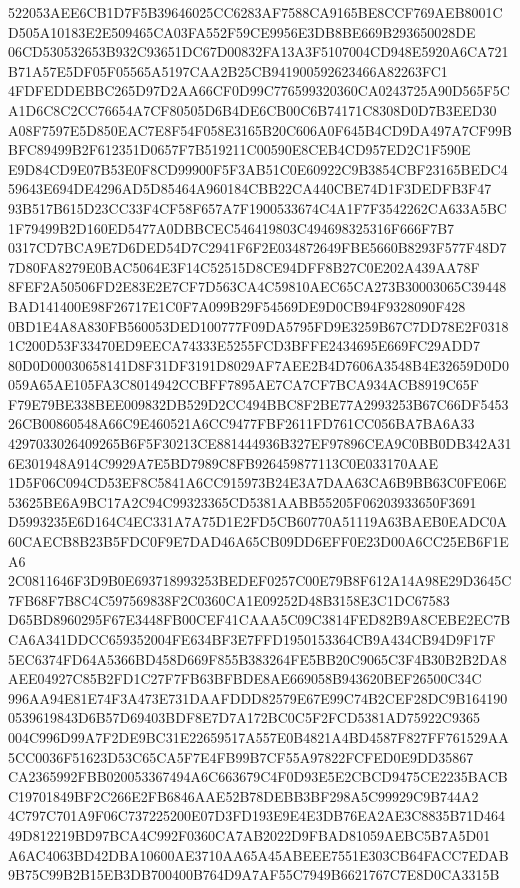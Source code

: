 \documentclass[UTF8,fontset=fandol,zihao=-4,a4paper]{ctexart}
\begin{document}
{{522053AEE6CB1D7F5B39646025CC6283AF7588CA9165BE8CCF769AEB8001CD505A10183E2E509465CA03FA552F59CE9956E3DB8BE669B293650028DE
06CD530532653B932C93651DC67D00832FA13A3F5107004CD948E5920A6CA721B71A57E5DF05F05565A5197CAA2B25CB941900592623466A82263FC1
4FDFEDDEBBC265D97D2AA66CF0D99C776599320360CA0243725A90D565F5CA1D6C8C2CC76654A7CF80505D6B4DE6CB00C6B74171C8308D0D7B3EED30
A08F7597E5D850EAC7E8F54F058E3165B20C606A0F645B4CD9DA497A7CF99BBFC89499B2F612351D0657F7B519211C00590E8CEB4CD957ED2C1F590E
E9D84CD9E07B53E0F8CD99900F5F3AB51C0E60922C9B3854CBF23165BEDC459643E694DE4296AD5D85464A960184CBB22CA440CBE74D1F3DEDFB3F47
93B517B615D23CC33F4CF58F657A7F1900533674C4A1F7F3542262CA633A5BC1F79499B2D160ED5477A0DBBCEC546419803C494698325316F666F7B7
0317CD7BCA9E7D6DED54D7C2941F6F2E034872649FBE5660B8293F577F48D77D80FA8279E0BAC5064E3F14C52515D8CE94DFF8B27C0E202A439AA78F
8FEF2A50506FD2E83E2E7CF7D563CA4C59810AEC65CA273B30003065C39448BAD141400E98F26717E1C0F7A099B29F54569DE9D0CB94F9328090F428
0BD1E4A8A830FB560053DED100777F09DA5795FD9E3259B67C7DD78E2F03181C200D53F33470ED9EECA74333E5255FCD3BFFE2434695E669FC29ADD7
80D0D00030658141D8F31DF3191D8029AF7AEE2B4D7606A3548B4E32659D0D0059A65AE105FA3C8014942CCBFF7895AE7CA7CF7BCA934ACB8919C65F
F79E79BE338BEE009832DB529D2CC494BBC8F2BE77A2993253B67C66DF545326CB00860548A66C9E460521A6CC9477FBF2611FD761CC056BA7BA6A33
4297033026409265B6F5F30213CE881444936B327EF97896CEA9C0BB0DB342A316E301948A914C9929A7E5BD7989C8FB926459877113C0E033170AAE
1D5F06C094CD53EF8C5841A6CC915973B24E3A7DAA63CA6B9BB63C0FE06E53625BE6A9BC17A2C94C99323365CD5381AABB55205F06203933650F3691
D5993235E6D164C4EC331A7A75D1E2FD5CB60770A51119A63BAEB0EADC0A60CAECB8B23B5FDC0F9E7DAD46A65CB09DD6EFF0E23D00A6CC25EB6F1EA6
2C0811646F3D9B0E693718993253BEDEF0257C00E79B8F612A14A98E29D3645C7FB68F7B8C4C597569838F2C0360CA1E09252D48B3158E3C1DC67583
D65BD8960295F67E3448FB00CEF41CAAA5C09C3814FED82B9A8CEBE2EC7BCA6A341DDCC659352004FE634BF3E7FFD1950153364CB9A434CB94D9F17F
5EC6374FD64A5366BD458D669F855B383264FE5BB20C9065C3F4B30B2B2DA8AEE04927C85B2FD1C27F7FB63BFBDE8AE669058B943620BEF26500C34C
996AA94E81E74F3A473E731DAAFDDD82579E67E99C74B2CEF28DC9B1641900539619843D6B57D69403BDF8E7D7A172BC0C5F2FCD5381AD75922C9365
004C996D99A7F2DE9BC31E22659517A557E0B4821A4BD4587F827FF761529AA5CC0036F51623D53C65CA5F7E4FB99B7CF55A97822FCFED0E9DD35867
CA2365992FBB020053367494A6C663679C4F0D93E5E2CBCD9475CE2235BACBC19701849BF2C266E2FB6846AAE52B78DEBB3BF298A5C99929C9B744A2
4C797C701A9F06C737225200E07D3FD193E9E4E3DB76EA2AE3C8835B71D46449D812219BD97BCA4C992F0360CA7AB2022D9FBAD81059AEBC5B7A5D01
A6AC4063BD42DBA10600AE3710AA65A45ABEEE7551E303CB64FACC7EDAB9B75C99B2B15EB3DB700400B764D9A7AF55C7949B6621767C7E8D0CA3315B
}}
\end{document}
